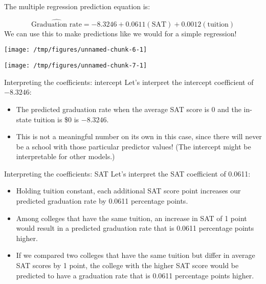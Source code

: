 \documentclass{beamer}\usepackage[]{graphicx}\usepackage[]{color}
\makeatletter
\def\maxwidth{ %
  \ifdim\Gin@nat@width>\linewidth
    \linewidth
  \else
    \Gin@nat@width
  \fi
}
\newenvironment{knitrout}{}{} %
\makeatother
\begin{document}
\begin{darkframes}
    \begin{frame}
      The multiple regression prediction equation is:

      \[
        \widehat{\text{Graduation rate}} =
          -8.3246 +
          0.0611(\text{SAT})
          + 0.0012(\text{tuition})
      \]
      \pause
      We can use this to make predictions like we would for a simple regression!
    \end{frame}

    \begin{frame}[fragile]
\begin{knitrout}
\color{fgcolor}
\texttt{[image: /tmp/figures/unnamed-chunk-6-1]} 

\end{knitrout}
    \end{frame}

    \begin{frame}[fragile]
\begin{knitrout}
\color{fgcolor}
\texttt{[image: /tmp/figures/unnamed-chunk-7-1]} 

\end{knitrout}
    \end{frame}

    \begin{frame}{Interpreting the coefficients: intercept}
      Let's interpret the intercept coefficient of $-8.3246$:
      \begin{itemize}[<+->]
        \item The predicted graduation rate when the average SAT score is 0 and the in-state tuition is \$0 is $-8.3246$.
        \item This is not a meaningful number on its own in this case, since there will never be a school with those particular predictor values! (The intercept might be interpretable for other models.)
      \end{itemize}
    \end{frame}

    \begin{frame}{Interpreting the coefficients: SAT}
      Let's interpret the SAT coefficient of 0.0611:
      \begin{itemize}[<+->]
        \item \alert{Holding tuition constant}, each additional SAT score point  increases our predicted graduation rate by 0.0611 percentage points.
        \item \alert{Among colleges that have the same tuition}, an increase in SAT of 1 point would result in a predicted graduation rate that is 0.0611 percentage points higher.
        \item \alert{If we compared two colleges that have the same tuition but differ in average SAT scores by 1 point}, the college with the higher SAT score would be predicted to have a graduation rate that is 0.0611 percentage points higher.
      \end{itemize}
    \end{frame}


\end{darkframes}
\end{document}
